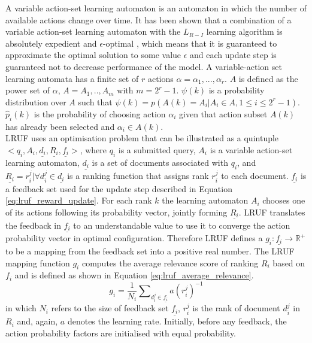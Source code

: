 A variable action-set learning automaton is an automaton in which the number of available actions change over time. It has been shown that a combination of a variable action-set learning automaton with the $L_{R-I}$ learning algorithm is absolutely expedient and $\epsilon$-optimal \cite{Thathachar1987}, which means that it is guaranteed to approximate the optimal solution to some value $\epsilon$ and each update step is guaranteed not to decrease performance of the model. A variable-action set learning automata has a finite set of $r$ actions $\alpha={\alpha_1,...,\alpha_r}$. $A$ is defined as the power set of $\alpha$, $A={A_1,..,A_m}$ with $m = 2^{r}-1$. $\psi(k)$ is a probability distribution over $A$ such that $\psi(k)=p(A(k)=A_i|A_i\in A, 1\le i \le 2^r-1)$. $\hat{p}_i(k)$ is the probability of choosing action $\alpha_i$ given that action subset $A(k)$ has already been selected and $\alpha_i \in A(k)$.\\

LRUF uses an optimisation problem that can be illustrated as a quintuple $<q_i,A_i,\underline{d_i},\underline{R_i},\underline{f_i}>$, where $q_i$ is a submitted query, $A_i$ is a variable action-set learning automaton, $\underline{d_i}$ is a set of documents associated with $q_i$, and $\underline{R_i}={r_i^j|\forall d_i^j \in \underline{d_i}}$ is a ranking function that assigns rank $r_i^j$ to each document. $\underline{f_i}$ is a feedback set used for the update step described in Equation \ref{eq:lruf_reward_update}. For each rank $k$ the learning automaton $A_i$ chooses one of its actions following its probability vector, jointly forming $\underline{R_i}$. LRUF translates the feedback in $\underline{f_i}$ to an understandable value to use it to converge the action probability vector in optimal configuration. Therefore LRUF defines a $g_i: \underline{f_i} \rightarrow \mathbb{R}^{+}$ to be a mapping from the feedback set into a positive real number. The LRUF mapping function $g_i$ computes the average relevance score of ranking $R_i$ based on $f_i$ and is defined as shown in Equation \ref{eq:lruf_average_relevance}.
\begin{equation}
g_i=\frac{1}{N_i}\sum\nolimits_{d_{i}^{j}\in \underline{f_i}} a(r_{i}^{j})^{-1}
\label{eq:lruf_average_relevance}
\end{equation}
\noindent in which $N_i$ refers to the size of feedback set $\underline{f_i}$, $r_i^j$ is the rank of document $d_i^j$ in $R_i$ and, again, $a$ denotes the learning rate. Initially, before any feedback, the action probability factors are initialised with equal probability.\\

